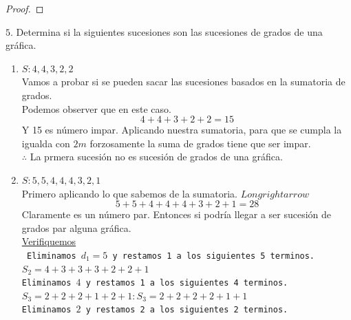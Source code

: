 \documentclass{article}
\begin{document}
\begin{enumerate}
\begin{proof}
    \end{proof}
    
    
  \end{enumerate}
  
  \begin{justify}
    $5$. Determina si la siguientes sucesiones son las sucesiones de grados de una gráfica.
    \begin{enumerate}[label=\alph*)]
    \item[a)] $S : 4, 4, 3, 2, 2$\\
      Vamos a probar si se pueden sacar las sucesiones basados en la sumatoria de grados. \\
      Podemos observer que en este caso. \\
      \begin{equation}
        4+4+3+2+2 = 15
      \end{equation}
      Y 15 es número impar. Aplicando nuestra sumatoria, para que se cumpla la igualda con $2m$ forzosamente la suma de grados tiene
      que ser impar. \\
      $\therefore$ La prmera sucesión no es sucesión de grados de una gráfica.
    \item[b)] $S : 5, 5, 4, 4, 4, 3, 2, 1$ \\
      Primero aplicando lo que sabemos de la sumatoria.
      $Longrightarrow$ \\
      \begin{equation}
        5+5+4+4+4+3+2+1 = 28
      \end{equation}
      Claramente es un número par. Entonces si podría llegar a ser sucesión de grados par alguna gráfica. \\
      \underline{Verifiquemos} \\
      \texttt{
        Eliminamos $d_1 = 5$ y restamos 1 a los siguientes 5 terminos. \\
        $S_2 = 4+3+3+3+2+2+1$ \\
        Eliminamos $4$ y restamos 1 a los siguientes 4 terminos. \\
        $S_3 = 2+2+2+1+2+1 : S_3 = 2+2+2+2+1+1$  \\
        Eliminamos $2$ y restamos 2 a los siguientes 2 terminos. \\
}
\end{enumerate}
\end{justify}
\end{document}
